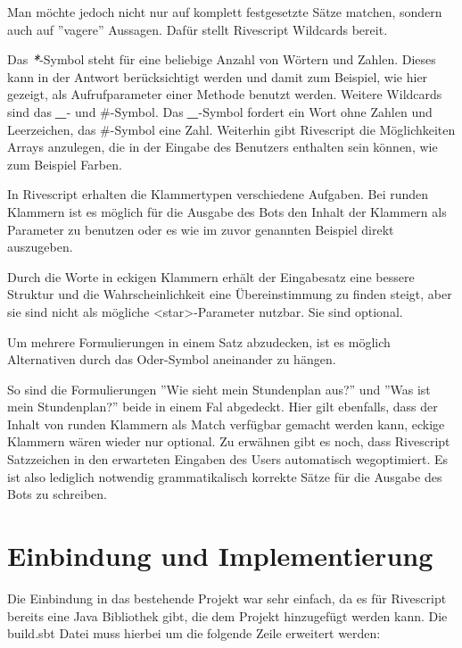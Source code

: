 Man möchte jedoch nicht nur auf komplett festgesetzte Sätze matchen, sondern auch auf ''vagere'' Aussagen. Dafür stellt Rivescript Wildcards bereit.


Das \emph{\textbf{*}}-Symbol steht für eine beliebige Anzahl von Wörtern und Zahlen. Dieses kann in der Antwort berücksichtigt werden und damit zum Beispiel, wie hier gezeigt,  als Aufrufparameter einer Methode benutzt werden.
Weitere Wildcards sind das \emph{\textbf{\_}}- und \#-Symbol. Das \emph{\textbf{\_}}-Symbol fordert ein Wort ohne Zahlen und Leerzeichen, das \#-Symbol eine Zahl.
Weiterhin gibt Rivescript die Möglichkeiten Arrays anzulegen, die in der Eingabe des Benutzers enthalten sein können, wie zum Beispiel Farben.


In Rivescript erhalten die Klammertypen verschiedene Aufgaben. Bei runden Klammern ist es möglich für die Ausgabe des Bots den Inhalt der Klammern als Parameter zu benutzen oder es wie im zuvor genannten Beispiel direkt auszugeben.

Durch die Worte in eckigen Klammern erhält der Eingabesatz eine bessere Struktur und die Wahrscheinlichkeit eine Übereinstimmung zu finden steigt, aber sie sind nicht als mögliche <star>-Parameter nutzbar. Sie sind optional.

Um mehrere Formulierungen in einem Satz abzudecken, ist es möglich Alternativen durch das Oder-Symbol aneinander zu hängen.


So sind die Formulierungen ''Wie sieht mein Stundenplan aus?'' und ''Was ist mein Stundenplan?'' beide in einem Fal abgedeckt. Hier gilt ebenfalls, dass der Inhalt von runden Klammern als Match verfügbar gemacht werden kann, eckige Klammern wären wieder nur optional.
Zu erwähnen gibt es noch, dass Rivescript Satzzeichen in den erwarteten Eingaben des Users automatisch wegoptimiert. Es ist also lediglich notwendig grammatikalisch korrekte Sätze für die Ausgabe des Bots zu schreiben.

\section{Einbindung und Implementierung}
Die Einbindung in das bestehende Projekt war sehr einfach, da es für Rivescript bereits eine Java Bibliothek gibt, die dem Projekt hinzugefügt werden kann. Die build.sbt Datei muss hierbei um die folgende Zeile erweitert werden:


